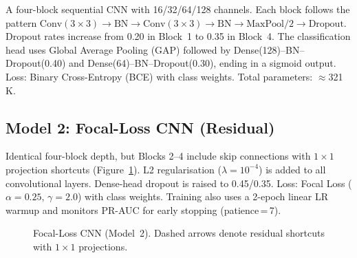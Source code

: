 \documentclass[10pt,twocolumn]{article}
\begin{document}
A four-block sequential CNN with 16/32/64/128 channels.
Each block follows the pattern
$\text{Conv}(3{\times}3)\!\to\!\text{BN}\!\to\!\text{Conv}(3{\times}3)\!\to\!\text{BN}\!\to\!\text{MaxPool}/2\!\to\!\text{Dropout}$.
Dropout rates increase from 0.20 in Block~1 to 0.35 in Block~4.
The classification head uses Global Average Pooling (GAP) followed by
Dense(128)--BN--Dropout(0.40) and Dense(64)--BN--Dropout(0.30),
ending in a sigmoid output.
Loss: Binary Cross-Entropy (BCE) with class weights.
Total parameters: $\approx$321\,K.

\subsection{Model 2: Focal-Loss CNN (Residual)}
\label{ssec:focal}

Identical four-block depth, but Blocks 2--4 include skip connections
with $1{\times}1$ projection shortcuts (Figure~\ref{fig:focal_arch}).
L2 regularisation ($\lambda=10^{-4}$) is added to all convolutional
layers.
Dense-head dropout is raised to 0.45/0.35.
Loss: Focal Loss ($\alpha=0.25,\,\gamma=2.0$) with class weights.
Training also uses a 2-epoch linear LR warmup and monitors
PR-AUC for early stopping (patience\,=\,7).

\begin{figure}[h]
\centering
{}
\caption{Focal-Loss CNN (Model~2). Dashed arrows denote residual
shortcuts with $1{\times}1$ projections.}
\label{fig:focal_arch}
\end{figure}
\end{document}
